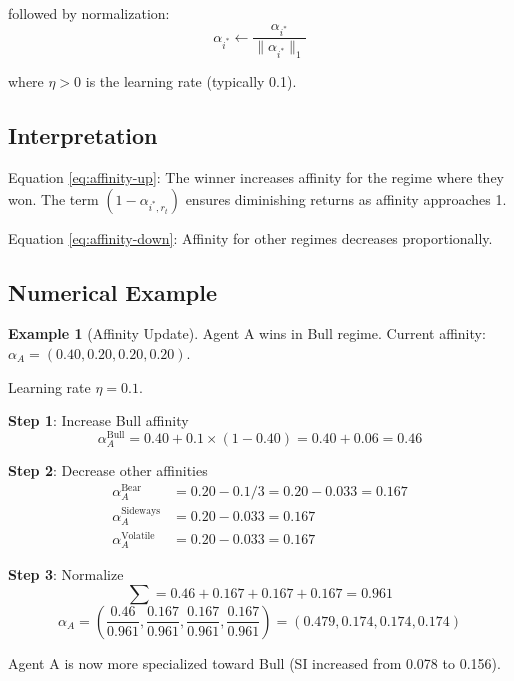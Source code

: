 \documentclass[11pt,a4paper]{article}
\theoremstyle{definition}
\newtheorem{example}{Example}[section]
\theoremstyle{plain}
\begin{document}
followed by normalization:
\begin{equation}
\alpha_{i^*} \leftarrow \frac{\alpha_{i^*}}{\|\alpha_{i^*}\|_1}
\end{equation}

where $\eta > 0$ is the learning rate (typically 0.1).

\subsection{Interpretation}

Equation \eqref{eq:affinity-up}: The winner increases affinity for the regime where they won. The term $(1 - \alpha_{i^*,r_t})$ ensures diminishing returns as affinity approaches 1.

Equation \eqref{eq:affinity-down}: Affinity for other regimes decreases proportionally.

\subsection{Numerical Example}

\begin{example}[Affinity Update]
Agent A wins in Bull regime. Current affinity: $\alpha_A = (0.40, 0.20, 0.20, 0.20)$.

Learning rate $\eta = 0.1$.

\textbf{Step 1}: Increase Bull affinity
\begin{equation}
\alpha_A^{\text{Bull}} = 0.40 + 0.1 \times (1 - 0.40) = 0.40 + 0.06 = 0.46
\end{equation}

\textbf{Step 2}: Decrease other affinities
\begin{align}
\alpha_A^{\text{Bear}} &= 0.20 - 0.1/3 = 0.20 - 0.033 = 0.167 \\
\alpha_A^{\text{Sideways}} &= 0.20 - 0.033 = 0.167 \\
\alpha_A^{\text{Volatile}} &= 0.20 - 0.033 = 0.167
\end{align}

\textbf{Step 3}: Normalize
\begin{equation}
\sum = 0.46 + 0.167 + 0.167 + 0.167 = 0.961
\end{equation}
\begin{equation}
\alpha_A = \left(\frac{0.46}{0.961}, \frac{0.167}{0.961}, \frac{0.167}{0.961}, \frac{0.167}{0.961}\right) = (0.479, 0.174, 0.174, 0.174)
\end{equation}

Agent A is now more specialized toward Bull (SI increased from 0.078 to 0.156).
\end{example}
\end{document}
